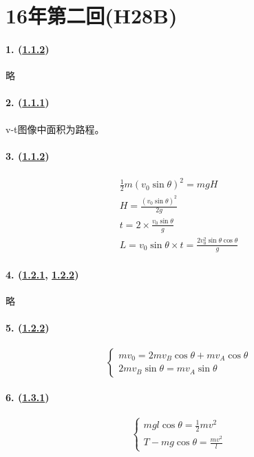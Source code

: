 
\section{16年第二回(H28B)}

\paragraph{1. (\hyperref[subsec:1.1.2]{1.1.2})} 略
\paragraph{2. (\hyperref[subsec:1.1.1]{1.1.1})} v-t图像中面积为路程。
\paragraph{3. (\hyperref[subsec:1.1.2]{1.1.2})}

\begin{gather*}
    \frac12m(v_0\sin\theta)^2=mgH\\
    H=\frac{(v_0\sin\theta)^2}{2g}\\
    t=2\times\frac{v_0\sin\theta}{g}\\
    L=v_0\sin\theta\times t=\frac{2v_0^2\sin\theta\cos\theta}{g}
\end{gather*}

\paragraph{4. (\hyperref[subsec:1.2.1]{1.2.1}, \hyperref[subsec:1.2.2]{1.2.2})} 略
\paragraph{5. (\hyperref[subsec:1.2.2]{1.2.2})}

\begin{equation*}
    \begin{cases}
        mv_0=2mv_B\cos\theta+mv_A\cos\theta\\
        2mv_B\sin\theta=mv_A\sin\theta
    \end{cases}
\end{equation*}

\paragraph{6. (\hyperref[subsec:1.3.1]{1.3.1})}

\begin{equation*}
    \begin{cases}
        mgl\cos\theta=\frac12mv^2\\
        T-mg\cos\theta=\frac{mv^2}{l}
    \end{cases}
\end{equation*}

